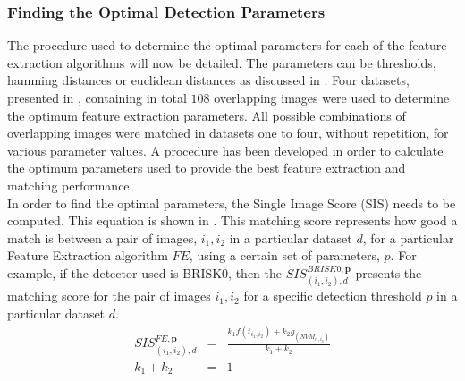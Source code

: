 \documentclass{article}
\begin{document}
\subsubsection{Finding the Optimal Detection Parameters}
\label{sec:optimalParameters}
The procedure used to determine the optimal parameters for each of the feature extraction algorithms will now be detailed. The parameters can be thresholds, hamming distances or euclidean distances as discussed in . Four datasets, presented in , containing in total $108$ overlapping images were used to determine the optimum feature extraction parameters. All possible combinations of overlapping images were matched in datasets  one to four, without repetition, for various parameter values. A procedure has been developed in order to calculate the optimum parameters used to provide the best feature extraction and matching performance.\\
In order to find the optimal parameters, the Single Image Score (SIS) needs to be computed. This equation is shown in . This matching score represents how good a match is between a pair of images, $i_1, i_2$ in a particular dataset $d$, for a particular Feature Extraction algorithm $FE$, using a certain set of parameters, $p$. For example, if the detector used is BRISK0, then the $SIS_{(i_1, i_2), d}^{BRISK0, \textbf{p}}$ presents the matching score for the pair of images $i_1, i_2$ for a specific detection threshold $p$ in a particular dataset $d$. \\

\begin{eqnarray}
SIS_{(i_1, i_2), d}^{FE, \textbf{p}} &=& \frac{k_1 f(t_{i_1,i_2}) + k_2 g_(\textit{NVM}_{i_1,i_2})}{k_1 + k_2} \\
k_1 + k_2 &=& 1  
\label{eqn:optimalParameters}
\end{eqnarray}
\end{document}

